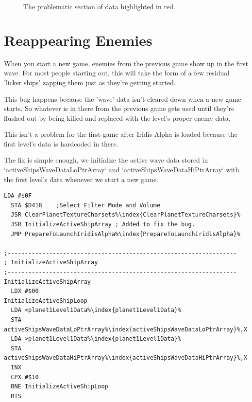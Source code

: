 \begin{figure}[H]
  {
    \begin{adjustbox}{width=14cm,center}
    \end{adjustbox}
  }\caption[]{The problematic section of data highlighted in red.}
\end{figure}



\section{Reappearing Enemies}

When you start a new game, enemies from the previous game show up in the first
wave. For most people starting out, this will take the form of a few residual
'licker ships' zapping them just as they're getting started.

This bug happens because the 'wave' data isn't cleared down when a new game
starts. So whatever is in there from the previous game gets used until they're
flushed out by being killed and replaced with the level's proper enemy data.

This isn't a problem for the first game after Iridis Alpha is loaded because
the first level's data is hardcoded in there.

The fix is simple enough, we initialize the active wave data stored in `activeShipsWaveDataLoPtrArray` and `activeShipsWaveDataHiPtrArray`
with the first level's data whenever we start a new game. 

\begin{lstlisting}[caption=Fixing the reappearing enemy bug,escapechar=\%]
  LDA #$0F 
  STA $D418    ;Select Filter Mode and Volume 
  JSR ClearPlanetTextureCharsets%\index{ClearPlanetTextureCharsets}% 
  JSR InitializeActiveShipArray ; Added to fix the bug.
  JMP PrepareToLaunchIridisAlpha%\index{PrepareToLaunchIridisAlpha}% 

;------------------------------------------------------------------ 
; InitializeActiveShipArray 
;------------------------------------------------------------------ 
InitializeActiveShipArray 
  LDX #$00 
InitializeActiveShipLoop 
  LDA <planet1Level1Data%\index{planet1Level1Data}% 
  STA activeShipsWaveDataLoPtrArray%\index{activeShipsWaveDataLoPtrArray}%,X 
  LDA >planet1Level1Data%\index{planet1Level1Data}% 
  STA activeShipsWaveDataHiPtrArray%\index{activeShipsWaveDataHiPtrArray}%,X 
  INX 
  CPX #$10 
  BNE InitializeActiveShipLoop 
  RTS 
\end{lstlisting}

